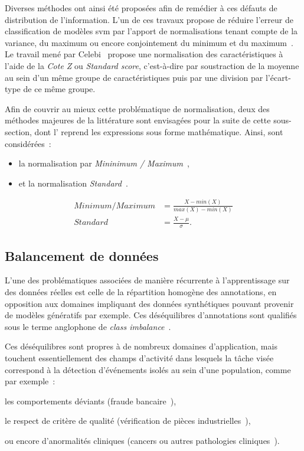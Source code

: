 Diverses méthodes ont ainsi été proposées afin de remédier à ces défauts de distribution de l'information. L'un de ces travaux propose de réduire l'erreur de classification de modèles \gls{svm} par l'apport de normalisations tenant compte de la variance, du maximum ou encore conjointement du minimum et du maximum~\cite{Juszczak2002}. Le travail mené par Celebi~ propose une normalisation des caractéristiques à l'aide de la \textit{Cote Z} ou \textit{Standard score}, c’est-à-dire par soustraction de la moyenne au sein d'un même groupe de caractéristiques puis par une division par l'écart-type de ce même groupe.\par

Afin de couvrir au mieux cette problématique de normalisation, deux des méthodes majeures de la littérature sont envisagées pour la suite de cette sous-section, dont l' reprend les expressions sous forme mathématique. Ainsi, sont considérées~:
\begin{itemize}
    \item la normalisation par \textit{Mininimum / Maximum}~\cite{Juszczak2002},
    \item et la normalisation \textit{Standard}~\cite{Celebi2007}.
\end{itemize}\par

\begin{equation} 
    \label{eq:scaling_methods}
    \begin{split}
    Minimum/Maximum&=\frac{X-min(X)}{max(X)-min(X)}  \\
    Standard&=\frac{X-\mu{}}{\sigma}.  
    \end{split}
\end{equation}

\subsection{Balancement de données}
\label{subsec:balancement}
L'une des problématiques associées de manière récurrente à l'apprentissage sur des données réelles est celle de la répartition homogène des annotations, en opposition aux domaines impliquant des données synthétiques pouvant provenir de modèles génératifs par exemple. Ces déséquilibres d'annotations sont qualifiés sous le terme anglophone de \textit{class imbalance}~\cite{Prati2009, HaiboHe2009}.\par

Ces déséquilibres sont propres à de nombreux domaines d'application, mais touchent essentiellement des champs d'activité dans lesquels la tâche visée correspond à la détection d'événements isolés au sein d'une population, comme par exemple~:~
\begin{inlinerate}
    \item les comportements déviants (fraude bancaire~\cite{Phua2004}),
    \item le respect de critère de qualité (vérification de pièces industrielles~\cite{Wu2018}),
    \item ou encore d'anormalités cliniques (cancers ou autres pathologies cliniques~\cite{Celebi2007}).
\end{inlinerate}\par

